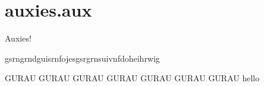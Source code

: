\chapter{auxies.aux}

Auxies!

\begin{definition}
    gsrngrndguisrnfojesgsrgrnsuivnfdoheihrwig

    GURAU GURAU GURAU GURAU GURAU GURAU GURAU hello
\end{definition}

\newpage